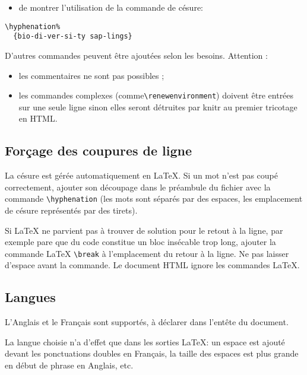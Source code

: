 \documentclass[fleqn,10pt]{latex/stylish_article} %
\providecommand{\tightlist}{%
  \setlength{\itemsep}{0pt}\setlength{\parskip}{0pt}}
\begin{document}
\begin{itemize}
\tightlist
\item
  de montrer l'utilisation de la commande de césure:
\end{itemize}

\begin{verbatim}
\hyphenation%
  {bio-di-ver-si-ty sap-lings}
\end{verbatim}

D'autres commandes peuvent être ajoutées selon les besoins.
Attention :

\begin{itemize}
\tightlist
\item
  les commentaires ne sont pas possibles ;
\item
  les commandes complexes (comme\break \texttt{\textbackslash{}renewenvironment}) doivent être entrées sur une seule ligne sinon elles seront détruites par knitr au premier tricotage en HTML.
\end{itemize}

\hypertarget{foruxe7age-des-coupures-de-ligne}{%
\subsection{Forçage des coupures de ligne}\label{foruxe7age-des-coupures-de-ligne}}

La césure est gérée automatiquement en LaTeX.
Si un mot n'est pas coupé correctement, ajouter son découpage dans le préambule du fichier avec la commande \texttt{\textbackslash{}hyphenation} (les mots sont séparés par des espaces, les emplacement de césure représentés par des tirets).

Si LaTeX ne parvient pas à trouver de solution pour le retout à la ligne, par exemple pare que du code constitue un bloc insécable trop long, ajouter la commande LaTeX \texttt{\textbackslash{}break} à l'emplacement du retour à la ligne.
Ne pas laisser d'espace avant la commande.
Le document HTML ignore les commandes LaTeX.

\hypertarget{langues}{%
\subsection{Langues}\label{langues}}

L'Anglais et le Français sont supportés, à déclarer dans l'entête du document.

La langue choisie n'a d'effet que dans les sorties LaTeX: un espace est ajouté devant les ponctuations doubles en Français, la taille des espaces est plus grande en début de phrase en Anglais, etc.
\end{document}
